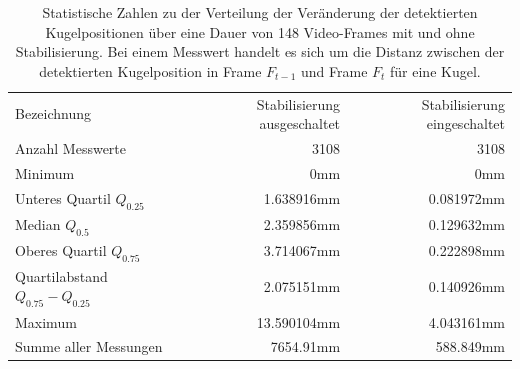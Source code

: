 \begin{table}[ht]
    \begin{tabular}{ lrr }
        \rowcolor{\seccolor!50}
        Bezeichnung & Stabilisierung ausgeschaltet & Stabilisierung eingeschaltet\\
        Anzahl Messwerte & 3108 & 3108\\
        Minimum & 0mm & 0mm\\
        Unteres Quartil $Q_{0.25}$ & 1.638916mm & 0.081972mm\\
        Median $Q_{0.5}$ & 2.359856mm & 0.129632mm\\
        Oberes Quartil $Q_{0.75}$ & 3.714067mm & 0.222898mm\\
        Quartilabstand $Q_{0.75} - Q_{0.25}$ & 2.075151mm & 0.140926mm\\
        Maximum & 13.590104mm & 4.043161mm\\
        Summe aller Messungen & 7654.91mm & 588.849mm
    \end{tabular}
    \caption{
        Statistische Zahlen zu der Verteilung der Veränderung der detektierten Kugelpositionen über eine Dauer von
        148 Video-Frames mit und ohne Stabilisierung.
        Bei einem Messwert handelt es sich um die Distanz zwischen der detektierten Kugelposition in Frame $F_{t-1}$
        und Frame $F_{t}$ für eine Kugel.
    }
    \label{tab:detektion_resultate_tracking_stats}
\end{table}


